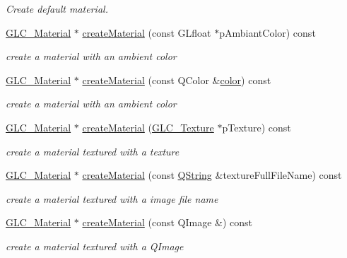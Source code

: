 \begin{DoxyCompactItemize}
\begin{DoxyCompactList}\small\item\em Create default material. \end{DoxyCompactList}\item 
\hyperlink{class_g_l_c___material}{G\-L\-C\-\_\-\-Material} $\ast$ \hyperlink{class_g_l_c___factory_aec8e0987fd15fa523c84eaae2b1b5879}{create\-Material} (const G\-Lfloat $\ast$p\-Ambiant\-Color) const 
\begin{DoxyCompactList}\small\item\em create a material with an ambient color \end{DoxyCompactList}\item 
\hyperlink{class_g_l_c___material}{G\-L\-C\-\_\-\-Material} $\ast$ \hyperlink{class_g_l_c___factory_a222024418f436942bee3fde9d34e2cf6}{create\-Material} (const Q\-Color \&\hyperlink{glext_8h_a3ea846f998d64f079b86052b6c4193a8}{color}) const 
\begin{DoxyCompactList}\small\item\em create a material with an ambient color \end{DoxyCompactList}\item 
\hyperlink{class_g_l_c___material}{G\-L\-C\-\_\-\-Material} $\ast$ \hyperlink{class_g_l_c___factory_abdf5be5f976ee87f149685677817486f}{create\-Material} (\hyperlink{class_g_l_c___texture}{G\-L\-C\-\_\-\-Texture} $\ast$p\-Texture) const 
\begin{DoxyCompactList}\small\item\em create a material textured with a texture \end{DoxyCompactList}\item 
\hyperlink{class_g_l_c___material}{G\-L\-C\-\_\-\-Material} $\ast$ \hyperlink{class_g_l_c___factory_a1a82f6800a30172efb4b4cfac599aa7e}{create\-Material} (const \hyperlink{group___u_a_v_objects_plugin_gab9d252f49c333c94a72f97ce3105a32d}{Q\-String} \&texture\-Full\-File\-Name) const 
\begin{DoxyCompactList}\small\item\em create a material textured with a image file name \end{DoxyCompactList}\item 
\hyperlink{class_g_l_c___material}{G\-L\-C\-\_\-\-Material} $\ast$ \hyperlink{class_g_l_c___factory_a8697f9f1eff70ad768bc6d41c912fb8e}{create\-Material} (const Q\-Image \&) const 
\begin{DoxyCompactList}\small\item\em create a material textured with a Q\-Image \end{DoxyCompactList}\item 

\end{DoxyCompactItemize}

